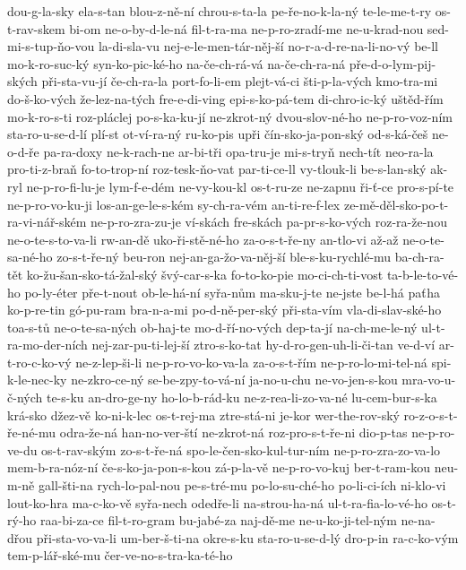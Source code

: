 dou-g-la-sky
ela-s-tan
blou-z-ně-ní
chrou-s-ta-la
pe-ře-no-k-la-ný
te-le-me-t-ry
os-t-rav-skem
bi-om
ne-o-by-d-le-ná
fil-t-ra-ma
ne-p-ro-zradí-me
ne-u-krad-nou
sed-mi-s-tup-ňo-vou
la-di-sla-vu
nej-e-le-men-tár-něj-ší
no-r-a-d-re-na-li-no-vý
be-ll
mo-k-ro-suc-ký
syn-ko-pic-ké-ho
na-če-ch-rá-vá
na-če-ch-ra-ná
pře-d-o-lym-pij-ských
při-sta-vu-jí
če-ch-ra-la
port-fo-li-em
plejt-vá-ci
šti-p-la-vých
kmo-tra-mi
do-š-ko-vých
že-lez-na-tých
fre-e-di-ving
epi-s-ko-pá-tem
di-chro-ic-ký
uštěd-řím
mo-k-ro-s-ti
roz-pláclej
po-s-ka-ku-jí
ne-zkrot-ný
dvou-slov-né-ho
ne-p-ro-voz-ním
sta-ro-u-se-d-lí
plí-st
ot-ví-ra-ný
ru-ko-pis
upři
čín-sko-ja-pon-ský
od-s-ká-češ
ne-o-d-ře
pa-ra-doxy
ne-k-rach-ne
ar-bi-tři
opa-tru-je
mi-s-tryň
nech-tít
neo-ra-la
pro-ti-z-braň
fo-to-trop-ní
roz-tesk-ňo-vat
par-ti-ce-ll
vy-tlouk-li
be-s-lan-ský
ak-ryl
ne-p-ro-fi-lu-je
lym-f-e-dém
ne-vy-kou-kl
os-t-ru-ze
ne-zapnu
ři-ť-ce
pro-s-pí-te
ne-p-ro-vo-ku-ji
los-an-ge-le-s-kém
sy-ch-ra-vém
an-ti-re-f-lex
ze-mě-děl-sko-po-t-ra-vi-nář-ském
ne-p-ro-zra-zu-je
ví-skách
fre-skách
pa-pr-s-ko-vých
roz-ra-že-nou
ne-o-te-s-to-va-li
rw-an-dě
uko-ři-stě-né-ho
za-o-s-t-ře-ny
an-tlo-vi
až-až
ne-o-te-sa-né-ho
zo-s-t-ře-ný
beu-ron
nej-an-ga-žo-va-něj-ší
ble-s-ku-rychlé-mu
ba-ch-ra-tět
ko-žu-šan-sko-tá-žal-ský
švý-car-s-ka
fo-to-ko-pie
mo-ci-ch-ti-vost
ta-b-le-to-vé-ho
po-ly-éter
pře-t-nout
ob-le-há-ní
syřa-nům
ma-sku-j-te
ne-jste
be-l-há
paťha
ko-p-re-tin
gó-pu-ram
bra-n-a-mi
po-d-ně-per-ský
při-sta-vím
vla-di-slav-ské-ho
toa-s-tů
ne-o-te-sa-ných
ob-haj-te
mo-d-ří-no-vých
dep-ta-jí
na-ch-me-le-ný
ul-t-ra-mo-der-ních
nej-zar-pu-ti-lej-ší
ztro-s-ko-tat
hy-d-ro-gen-uh-li-či-tan
ve-d-ví
ar-t-ro-c-ko-vý
ne-z-lep-ši-li
ne-p-ro-vo-ko-va-la
za-o-s-t-řím
ne-p-ro-lo-mi-tel-ná
spi-k-le-nec-ky
ne-zkro-ce-ný
se-be-zpy-to-vá-ní
ja-no-u-chu
ne-vo-jen-s-kou
mra-vo-u-č-ných
te-s-ku
an-dro-ge-ny
ho-lo-b-rád-ku
ne-z-rea-li-zo-va-né
lu-cem-bur-s-ka
krá-sko
džez-vě
ko-ni-k-lec
os-t-rej-ma
ztre-stá-ni
je-kor
wer-the-rov-ský
ro-z-o-s-t-ře-né-mu
odra-že-ná
han-no-ver-ští
ne-zkrot-ná
roz-pro-s-t-ře-ni
dio-p-tas
ne-p-ro-ve-du
os-t-rav-ským
zo-s-t-ře-ná
spo-le-čen-sko-kul-tur-ním
ne-p-ro-zra-zo-va-lo
mem-b-ra-nóz-ní
če-s-ko-ja-pon-s-kou
zá-p-la-vě
ne-p-ro-vo-kuj
ber-t-ram-kou
neu-m-ně
gall-šti-na
rych-lo-pal-nou
pe-s-tré-mu
po-lo-su-ché-ho
po-li-ci-ích
ni-klo-vi
lout-ko-hra
ma-c-ko-vě
syřa-nech
odedře-li
na-strou-ha-ná
ul-t-ra-fia-lo-vé-ho
os-t-rý-ho
raa-bi-za-ce
fil-t-ro-gram
bu-jabé-za
naj-dě-me
ne-u-ko-ji-tel-ným
ne-na-dřou
při-sta-vo-va-li
um-ber-š-ti-na
okre-s-ku
sta-ro-u-se-d-lý
dro-p-in
ra-c-ko-vým
tem-p-lář-ské-mu
čer-ve-no-s-tra-ka-té-ho

